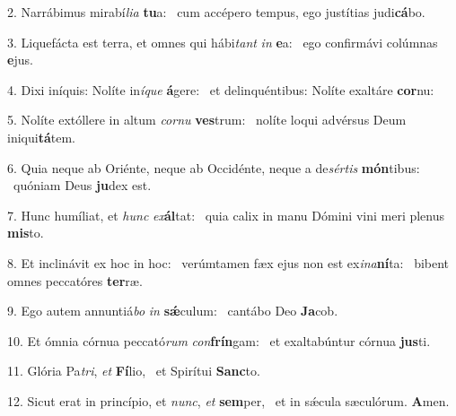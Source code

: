 2. Narrábimus mirabí\textit{li}\textit{a} \textbf{tu}a: \ast\  cum accépero tempus, ego justítias judi\textbf{cá}bo.\

3. Liquefácta est terra, et omnes qui hábi\textit{tant} \textit{in} \textbf{e}a: \ast\  ego confirmávi colúmnas \textbf{e}jus.\

4. Dixi iníquis: Nolíte in\textit{í}\textit{que} \textbf{á}gere: \ast\  et delinquéntibus: Nolíte exaltáre \textbf{cor}nu:\

5. Nolíte extóllere in altum \textit{cor}\textit{nu} \textbf{ves}trum: \ast\  nolíte loqui advérsus Deum iniqui\textbf{tá}tem.\

6. Quia neque ab Oriénte, neque ab Occidénte, neque a de\textit{sér}\textit{tis} \textbf{món}tibus: \ast\  quóniam Deus \textbf{ju}dex est.\

7. Hunc humíliat, et \textit{hunc} \textit{ex}\textbf{ál}tat: \ast\  quia calix in manu Dómini vini meri plenus \textbf{mis}to.\

8. Et inclinávit ex hoc in hoc: \dag\  verúmtamen fæx ejus non est ex\textit{i}\textit{na}\textbf{ní}ta: \ast\  bibent omnes peccatóres \textbf{ter}ræ.\

9. Ego autem annuntiá\textit{bo} \textit{in} \textbf{sǽ}culum: \ast\  cantábo Deo \textbf{Ja}cob.\

10. Et ómnia córnua peccató\textit{rum} \textit{con}\textbf{frín}gam: \ast\  et exaltabúntur córnua \textbf{jus}ti.\

11. Glória Pa\textit{tri}, \textit{et} \textbf{Fí}lio, \ast\  et Spirítui \textbf{Sanc}to.\

12. Sicut erat in princípio, et \textit{nunc}, \textit{et} \textbf{sem}per, \ast\  et in sǽcula sæculórum. \textbf{A}men.\

